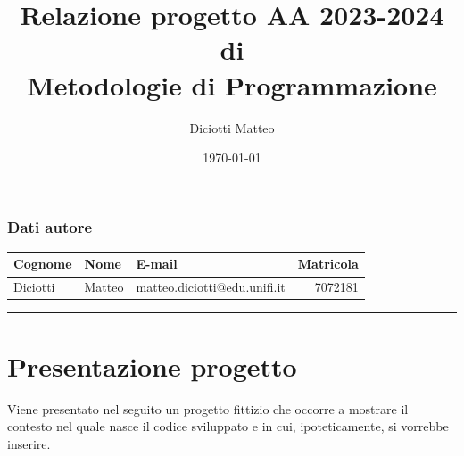 \documentclass[a4paper,11pt]{article}
\author{Diciotti Matteo}
\title{Relazione progetto AA 2023-2024 di\\ \textbf{Metodologie di Programmazione}}
\date{\today}
\begin{document}
	
	\maketitle
	
	\subsubsection*{Dati autore}
	\begin{tabularx}{\textwidth}{l l >{\raggedleft\arraybackslash}X r}
		\textbf{Cognome} & \textbf{Nome} & \textbf{E-mail} & \textbf{Matricola}\\\toprule
		Diciotti & Matteo & matteo.diciotti@edu.unifi.it & 7072181
	\end{tabularx}
	
	\tableofcontents
	\vspace{1em}\noindent\rule{\textwidth}{2pt}
	
	\section{Presentazione progetto}
	Viene presentato nel seguito un progetto fittizio che occorre a mostrare il contesto nel quale nasce il codice sviluppato e in cui, ipoteticamente, si vorrebbe inserire.
\end{document}
